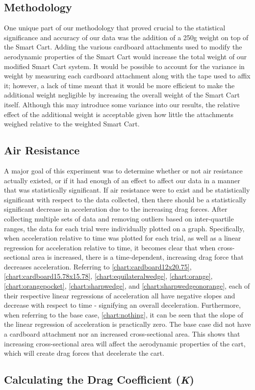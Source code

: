 \subsection{Methodology}
One unique part of our methodology that proved crucial to the statistical
significance and accuracy of our data was the addition of a 250g weight on top of the
Smart Cart. Adding the various cardboard attachments used to modify the aerodynamic properties of the
Smart Cart would increase the total weight of our modified Smart Cart system. It would be possible to
account for the variance in weight by measuring each cardboard attachment along with the tape used to
affix it; however, a lack of time meant that it would be more efficient to make the additional weight
negligible by increasing the overall weight of the Smart Cart itself. Although this may introduce some
variance into our results, the relative effect of the additional weight is acceptable given how little
the attachments weighed relative to the weighted Smart Cart.

\subsection{Air Resistance}
A major goal of this experiment was to determine whether or not air resistance actually existed, or if 
it had enough of an effect to affect our data in a manner that was statistically significant. If air resistance
were to exist and be statistically significant with respect to the data collected, then there should be a statistically significant
decrease in acceleration due to the increasing drag forces. After collecting multiple sets of
data and removing outliers based on inter-quartile ranges, the data for each trial were individually plotted on a graph.
Specifically, when acceleration relative to time was plotted for each trial, as well as a linear regression for acceleration relative to time,
it becomes clear that when cross-sectional area is increased, there is a time-dependent, increasing drag force that decreases acceleration.
Referring to \ref{chart:cardboard12x20.75}, \ref{chart:cardboard15.78x15.78}, \ref{chart:equilateralwedge}, \ref{chart:orange}, \ref{chart:orangepocket}, \ref{chart:sharpwedge}, and \ref{chart:sharpwedgeonorange},
each of their respective linear regressions of acceleration all have negative slopes and decrease with respect to time - signifying an overall deceleration.
Furthermore, when referring to the base case, \ref{chart:nothing}, it can be seen that the slope of the linear regression of acceleration is
practically zero. The base case did not have a cardboard attachment nor an increased cross-sectional area.
This shows that increasing cross-sectional area will affect the aerodynamic properties of the cart,
which will create drag forces that decelerate the cart.

\subsection{Calculating the Drag Coefficient (\textit{K})}